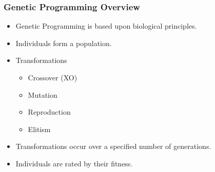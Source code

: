 \documentclass{beamer}
\begin{document}
\begin{frame}
  \frametitle{Genetic Programming Overview}

 
  \begin{itemize}
  	\item Genetic Programming is based upon biological principles.
	\item Individuals form a population.
	\item Transformations
		\begin{itemize}
		\item Crossover (XO)
		\item Mutation
		\item Reproduction
		\item Elitism
		\end{itemize}
	\item Transformations occur over a specified number of generations.
	\item Individuals are rated by their fitness.
  \end{itemize}
\end{frame}
\end{document}
